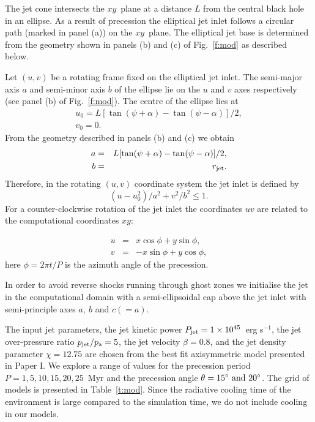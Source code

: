 \documentclass[useAMS, usenatbib]{mn2e}
\begin{document}
The jet cone intersects the $xy$~plane at a distance $L$ from the central black hole in an ellipse. As a result of precession the elliptical jet inlet follows a circular path (marked in panel (a)) on the $xy$~plane. The elliptical jet base is determined from the geometry shown in panels (b) and (c) of Fig.~\ref{f:mod} as described below.  

Let $(u,v)$ be a rotating frame fixed on the elliptical jet inlet. The semi-major axis $a$ and semi-minor axis $b$ of the ellipse lie on the $u$ and $v$ axes respectively (see panel (b) of Fig.~\ref{f:mod}). The centre of the ellipse lies at 
\begin{eqnarray}
u_0 = L[\tan(\psi+\alpha) - \tan(\psi - \alpha)]/2, \\
v_0 = 0.
\end{eqnarray}
From the geometry described in panels (b) and (c) we obtain 
\begin{eqnarray}
a &=& L[\tan(\psi + \alpha) - \tan(\psi -\alpha)]/2, \\
b &=& r_{\rm jet}.
\end{eqnarray}
Therefore, in the rotating $(u,v)$ coordinate system the jet inlet is defined by 
\begin{equation}
(u - u_0^2)/a^2 + v^2/ b^2 \leq 1.
\end{equation}
For a counter-clockwise rotation of the jet inlet the coordinates $uv$ are related to the computational coordinates $xy$: 

\begin{eqnarray}
u &=& x\cos \phi + y \sin \phi, \\
v &= &- x \sin \phi + y \cos \phi,
\end{eqnarray} 
here $\phi = 2\pi t/P$ is the azimuth angle of the precession. 


In order to avoid reverse shocks running through ghost zones we initialise the jet in the computational domain with a semi-ellipsoidal cap above the jet inlet with semi-principle axes $a, \ b$ and $c (= a)$. 


The input jet parameters, the jet kinetic power $P_{\rm jet} = 1\times 10^{45}$~erg s$^{-1}$, the jet over-pressure ratio $p_{\rm jet}/p_{\rm a} = 5$, the jet velocity $\beta = 0.8$, and the jet density parameter $\chi = 12.75$ are chosen from the best fit axisymmetric model presented in Paper I. We explore a range of values for the precession period $P = 1, 5, 10, 15, 20, 25$~Myr and the precession angle $\theta = 15^{\circ} \rm \ and \ 20^{\circ}$. The grid of models is presented in Table~\ref{t:mod}. Since the radiative cooling time of the environment is large compared to the simulation time, we do not include cooling in our models. 
\end{document}

